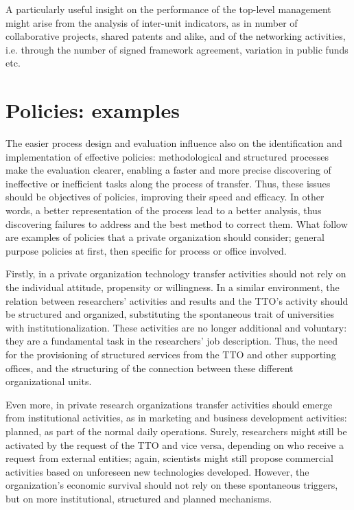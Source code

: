 A particularly useful insight on the performance of the top-level management might arise from the analysis of inter-unit indicators, as in number of collaborative projects, shared patents and alike, and of the networking activities, i.e. through the number of signed framework agreement, variation in public funds etc.

\section{Policies: examples} 

The easier process design and evaluation influence also on the identification and implementation of effective policies:  methodological and structured processes make the evaluation clearer, enabling a faster and more precise discovering of ineffective or inefficient tasks along the process of transfer. Thus, these issues should be objectives of policies, improving their speed and efficacy. In other words, a better representation of the process lead to a better analysis, thus discovering failures to address and the best method to correct them. What follow are examples of policies that a private organization should consider; general purpose policies at first, then specific for process or office involved.

Firstly, in a private organization technology transfer activities should not rely on the individual attitude, propensity or willingness. In a similar environment, the relation between researchers' activities and results and the TTO's activity should be structured and organized, substituting the spontaneous trait of universities with institutionalization. These activities are no longer additional and voluntary: they are a fundamental task in the researchers' job description. Thus, the need for the provisioning of structured services from the TTO and other supporting offices, and the structuring of the connection between these different organizational units. 

Even more, in private research organizations transfer activities should emerge from institutional activities, as in marketing and business development activities: planned, as part of the normal daily operations. Surely, researchers might still be activated by the request of the TTO and vice versa, depending on who receive a request from external entities; again, scientists might still propose commercial activities based on unforeseen new technologies developed. However, the organization's economic survival should not rely on these spontaneous triggers, but on more institutional, structured and planned mechanisms.

